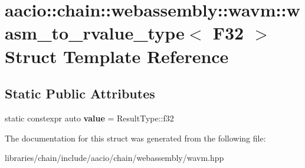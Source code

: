 \hypertarget{structaacio_1_1chain_1_1webassembly_1_1wavm_1_1wasm__to__rvalue__type_3_01_f32_01_4}{}\section{aacio\+:\+:chain\+:\+:webassembly\+:\+:wavm\+:\+:wasm\+\_\+to\+\_\+rvalue\+\_\+type$<$ F32 $>$ Struct Template Reference}
\label{structaacio_1_1chain_1_1webassembly_1_1wavm_1_1wasm__to__rvalue__type_3_01_f32_01_4}
\subsection*{Static Public Attributes}
\begin{DoxyCompactItemize}
\item 
\mbox{\label{structaacio_1_1chain_1_1webassembly_1_1wavm_1_1wasm__to__rvalue__type_3_01_f32_01_4_a4f0b0d20af7aed5a0fcedfdb1e9ab4e4}} 
static constexpr auto {\bfseries value} = Result\+Type\+::f32
\end{DoxyCompactItemize}


The documentation for this struct was generated from the following file\+:\begin{DoxyCompactItemize}
\item 
libraries/chain/include/aacio/chain/webassembly/wavm.\+hpp\end{DoxyCompactItemize}
